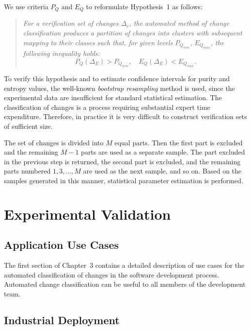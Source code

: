 \documentclass[11pt,a4paper]{article}
\begin{document}
We use criteria $P_Q$ and $E_Q$ to reformulate Hypothesis~1 as follows:

\begin{quote}
\textit{For a verification set of changes $\Delta_e$, the automated method of change classification produces a partition of changes into clusters with subsequent mapping to their classes such that, for given levels $P_{Q_{min}}$, $E_{Q_{max}}$, the following inequality holds:}
\begin{equation}
    P_Q(\Delta_E) > P_{Q_{min}}, \quad E_Q(\Delta_E) < E_{Q_{max}}.
\end{equation}
\end{quote}

To verify this hypothesis and to estimate confidence intervals for purity and entropy values, the well-known \textit{bootstrap resampling} method is used, since the experimental data are insufficient for standard statistical estimation. The classification of changes is a process requiring substantial expert time expenditure. Therefore, in practice it is very difficult to construct verification sets of sufficient size.

The set of changes is divided into $M$ equal parts. Then the first part is excluded and the remaining $M-1$ parts are used as a separate sample. The part excluded in the previous step is returned, the second part is excluded, and the remaining parts numbered $1, 3, \ldots, M$ are used as the next sample, and so on. Based on the samples generated in this manner, statistical parameter estimation is performed.

\section{Experimental Validation}
\label{sec:experiments}

\subsection{Application Use Cases}

The first section of Chapter~3 contains a detailed description of use cases for the automated classification of changes in the software development process. Automated change classification can be useful to all members of the development team.

\subsection{Industrial Deployment}
\end{document}
